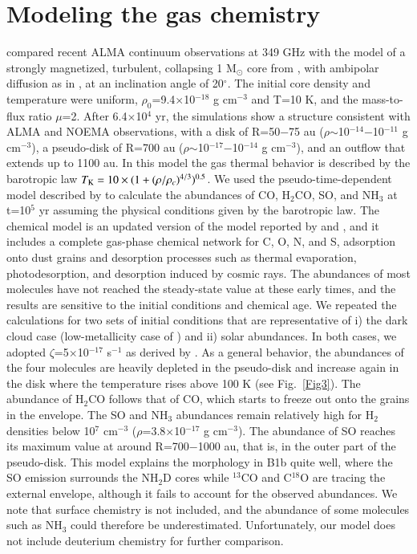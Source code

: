 \documentclass[letter]{aa}
\begin{document}
\section{Modeling the gas chemistry}
\citet{Gerin16} compared recent ALMA continuum observations at 349 GHz with the model of
a strongly magnetized, turbulent, collapsing 1 M$_\odot$ core from \citet{Henne16}, with
ambipolar diffusion as in \citet{Masson16}, at an inclination angle of 20$^\circ$. 
The initial core density and temperature were uniform, $\rho_0$=9.4$\times$10$^{-18}$ g cm$^{-3}$
and T=10 K, and the mass-to-flux ratio $\mu$=2. After 6.4$\times$10$^4$ yr, the simulations
show a structure consistent with ALMA and NOEMA observations,
with a disk of R=50$-$75 au ($\rho$$\sim$10$^{-14}$$-$10$^{-11}$ g cm$^{-3}$), a pseudo-disk of
R=700 au ($\rho$$\sim$10$^{-17}$$-$10$^{-14}$ g cm$^{-3}$), and an outflow that extends up
to 1100 au. In this model the gas thermal behavior is described by the barotropic law
$T_{\rm K}  = 10 \times (1+ ( \rho/\rho_c)^{4/3} )^{0.5}$. We used the pseudo-time-dependent  model described by
\citet{Pacheco15,Pacheco16} to calculate the abundances of CO, H$_2$CO, SO, and NH$_3$
at t=10$^5$ yr assuming the physical conditions given by the barotropic law.
The chemical model is an updated  version  of the model reported  
by  \citet{Agundez08} and \citet{Fuente10}, and it includes a complete gas-phase chemical network for C, O, N, and S,
adsorption onto dust grains and desorption processes such as thermal evaporation, photodesorption,
and desorption induced by cosmic rays. The abundances of most molecules have not reached the steady-state
value at these early times, and the results are sensitive to the initial conditions and chemical age. We repeated the calculations
for two sets of initial conditions that are representative of i) the dark cloud case (low-metallicity case of
\citet{Wiebe03}) and ii) solar abundances. In both cases, we adopted $\zeta$=5$\times$10$^{-17}$ s$^{-1}$
as derived by \citet{Fuente16}. As a general behavior, the abundances of the four molecules are
heavily depleted in the pseudo-disk and increase again in the disk where the temperature rises above 100 K (see Fig.~\ref{Fig3}). 
The abundance of H$_2$CO follows that of CO, which starts to freeze out onto the grains in the envelope.   
The SO and NH$_3$ abundances remain relatively high for H$_2$ densities 
below 10$^7$ cm$^{-3}$ ($\rho$=3.8$\times$10$^{-17}$ g cm$^{-3}$). The abundance of 
SO reaches its maximum value at around R=700$-$1000 au, that is, in the outer part of the pseudo-disk.
This model explains the morphology in B1b quite well, where the SO emission surrounds the NH$_2$D cores
while $^{13}$CO and C$^{18}$O are tracing the external envelope, although it fails to account for the observed abundances.
We note that surface chemistry is not included,  and the abundance of some molecules such as NH$_3$ 
could therefore be underestimated. Unfortunately, our model does not include deuterium 
chemistry for further comparison.
\end{document}
